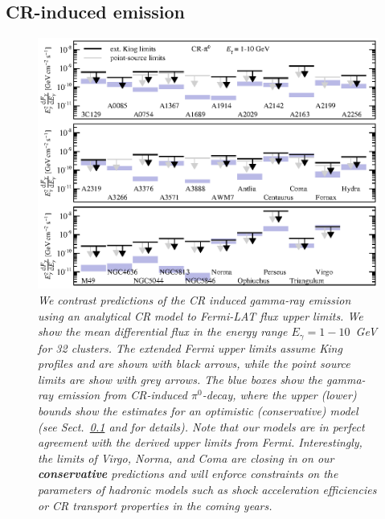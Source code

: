 \documentclass[10pt,aps,pra,reprint,amsmath,amsfonts,amssymb,showpacs,nofootinbib,floatfix]{revtex4-1}
\def\C#1{{\bf #1}}
\newcommand{\Fermi}{{\em Fermi}\xspace}
\begin{document}
\subsection{CR-induced emission}
\label{sec:CRemission} 
\begin{figure}
\begin{minipage}{2.0\columnwidth}
  \includegraphics[width=0.99\columnwidth]{figures/Fermi.comp.CR.diff.eps}
  \caption{\it We contrast predictions of the CR induced gamma-ray
    emission using an analytical CR model \protect
    \cite{2010MNRAS.409..449P} to \Fermi-LAT flux upper limits. We
    show the mean differential flux in the energy range
    $E_\gamma=1-10$~GeV for 32 clusters. The extended \Fermi upper
    limits assume King profiles and are shown with black arrows, while
    the point source limits are show with grey arrows. The blue boxes
    show the gamma-ray emission from CR-induced $\pi^0$-decay, where
    the upper (lower) bounds show the estimates for an optimistic
    (conservative) model (see Sect.~\ref{sec:CRemission} and
    \cite{2010MNRAS.409..449P} for details). Note that our models are
    in perfect agreement with the derived upper limits from
    \Fermi. Interestingly, the limits of Virgo, Norma, and Coma are
    closing in on our \C{conservative} predictions and will enforce
    constraints on the parameters of hadronic models such as shock
    acceleration efficiencies or CR transport properties in the coming
    years.}
 \label{fig15}
\end{minipage}
\end{figure}
\end{document}
